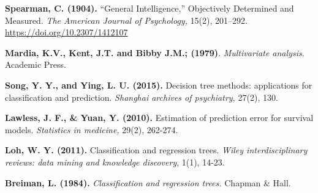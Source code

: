 \begin{thebibliography}{99}
\textbf{Spearman, C. (1904).} “General Intelligence,” Objectively Determined and Measured. \emph{The American Journal of Psychology,} 15(2), 201–292. \url{https://doi.org/10.2307/1412107}

\textbf{Mardia, K.V., Kent, J.T. and Bibby J.M.; (1979)}. \emph{Multivariate analysis}. Academic Press.

\textbf{Song, Y. Y., and Ying, L. U. (2015).} Decision tree methods: applications for classification and prediction. \emph{Shanghai archives of psychiatry,} 27(2), 130.

 \textbf{Lawless, J. F., \& Yuan, Y. (2010).} Estimation of prediction error for survival models. \emph{Statistics in medicine,} 29(2), 262-274.

\textbf{Loh, W. Y. (2011).} Classification and regression trees.\emph{ Wiley interdisciplinary reviews: data mining and knowledge discovery}, 1(1), 14-23.

\textbf{Breiman, L. (1984).} \emph{Classification and regression trees. }Chapman \& Hall.
\end{thebibliography}
 